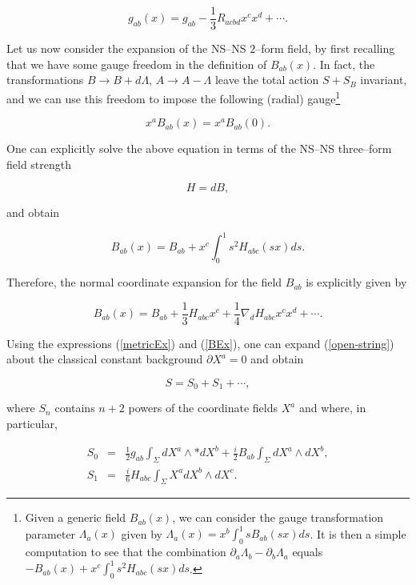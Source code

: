 \documentclass[a4paper,11pt]{article}
\newcommand{\notag}{\nonumber}
\begin{document}
\begin{equation}
g_{ab}\left( x\right) =g_{ab}-\frac{1}{3}R_{acbd}x^{c}x^{d}+\cdots .
\label{metricEx}
\end{equation}

\noindent
Let us now consider the expansion of the NS--NS $2$--form field, by first
recalling that we have some gauge freedom in the definition of $B_{ab}\left(
x\right)$. In fact, the transformations $B\rightarrow B+d\Lambda$, 
$A\rightarrow A-\Lambda$ leave the total action $S+S_{B}$ invariant, and we
can use this freedom to impose the following (radial) gauge\footnote{Given 
a generic field $B_{ab}\left( x\right) $, we can consider the gauge
transformation parameter $\Lambda _{a}\left( x\right) $ given by $\Lambda
_{a}\left( x\right) =x^{b}\int_{0}^{1}sB_{ab}\left( sx\right) ds$. It is
then a simple computation to see that the combination $\partial _{a}\Lambda
_{b}-\partial _{b}\Lambda _{a}$ equals $-B_{ab}\left( x\right)
+x^{c}\int_{0}^{1}s^{2}H_{abc}\left( sx\right) ds$.} 

$$
x^{a}B_{ab}\left( x\right) =x^{a}B_{ab}\left( 0\right) .
$$

\noindent
One can explicitly solve the above equation in terms of the NS--NS 
three--form field strength

$$
H=dB,
$$

\noindent
and obtain 

$$
B_{ab}\left( x\right) =B_{ab}+x^{c}\int_{0}^{1}s^{2}H_{abc}\left( sx\right)
ds.
$$

\noindent
Therefore, the normal coordinate expansion for the field $B_{ab}$ is
explicitly given by

\begin{equation}
B_{ab}\left( x\right) =B_{ab}+\frac{1}{3}H_{abc}x^{c}+\frac{1}{4}\nabla
_{d}H_{abc}x^{c}x^{d}+\cdots .
\label{BEx}
\end{equation}

Using the expressions (\ref{metricEx}) and (\ref{BEx}), one can expand 
(\ref{open-string}) about the classical constant background $\partial X^{a}=0$ and 
obtain

\begin{equation}
S=S_{0}+S_{1}+\cdots ,
\label{exp}
\end{equation}

\noindent
where $S_{n}$ contains $n+2$ powers of the coordinate fields $X^{a}$ and
where, in particular, 

\begin{eqnarray}
S_{0} &=&\frac{1}{2}g_{ab}\int_{\Sigma }dX^{a}\wedge \ast dX^{b}+\frac{i}{2}
B_{ab}\int_{\Sigma }dX^{a}\wedge dX^{b} , \notag \\
S_{1} &=&\frac{i}{6}H_{abc}\int_{\Sigma }X^{a}dX^{b}\wedge dX^{c}.
\label{a1}
\end{eqnarray}
\end{document}
